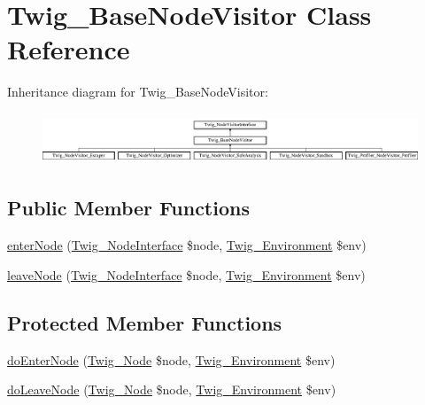 \hypertarget{classTwig__BaseNodeVisitor}{}\section{Twig\+\_\+\+Base\+Node\+Visitor Class Reference}
\label{classTwig__BaseNodeVisitor}
Inheritance diagram for Twig\+\_\+\+Base\+Node\+Visitor\+:\begin{figure}[H]
\begin{center}
\leavevmode
\includegraphics[height=1.548387cm]{classTwig__BaseNodeVisitor}
\end{center}
\end{figure}
\subsection*{Public Member Functions}
\begin{DoxyCompactItemize}
\item 
\hyperlink{classTwig__BaseNodeVisitor_a457914082923807ed3022cd09ff1d5c0}{enter\+Node} (\hyperlink{interfaceTwig__NodeInterface}{Twig\+\_\+\+Node\+Interface} \$node, \hyperlink{classTwig__Environment}{Twig\+\_\+\+Environment} \$env)
\item 
\hyperlink{classTwig__BaseNodeVisitor_affa95ec0a2c153977d9b0dcae4122e37}{leave\+Node} (\hyperlink{interfaceTwig__NodeInterface}{Twig\+\_\+\+Node\+Interface} \$node, \hyperlink{classTwig__Environment}{Twig\+\_\+\+Environment} \$env)
\end{DoxyCompactItemize}
\subsection*{Protected Member Functions}
\begin{DoxyCompactItemize}
\item 
\hyperlink{classTwig__BaseNodeVisitor_a372ef3cc449de278f818d42248625f88}{do\+Enter\+Node} (\hyperlink{classTwig__Node}{Twig\+\_\+\+Node} \$node, \hyperlink{classTwig__Environment}{Twig\+\_\+\+Environment} \$env)
\item 
\hyperlink{classTwig__BaseNodeVisitor_a35fabbc0780fd0cd9fd21900d5e285ab}{do\+Leave\+Node} (\hyperlink{classTwig__Node}{Twig\+\_\+\+Node} \$node, \hyperlink{classTwig__Environment}{Twig\+\_\+\+Environment} \$env)
\end{DoxyCompactItemize}


